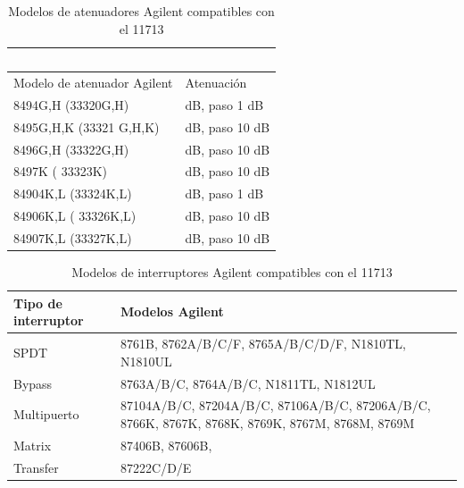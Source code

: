 \begin{table}
	\centering
	
	\tablefirsthead{}
	\tablehead{}
	\tabletail{}
	\tablelasttail{}
	\begin{supertabular}{|m{8.514cm}|m{8.514cm}|}
		\hline
			\\
		\hline
		Modelo de atenuador Agilent & \arraybslash Atenuación\\
		\hline
		8494G,H (33320G,H) &  dB, paso 1 dB \\
		\hline
		8495G,H,K (33321 G,H,K) &  dB, paso 10 dB \\
		\hline
		8496G,H (33322G,H) &  dB, paso 10 dB \\
		\hline
		8497K ( 33323K) &  dB, paso 10 dB \\
		\hline
		84904K,L (33324K,L) &  dB, paso 1 dB \\
		\hline
		84906K,L ( 33326K,L) &  dB, paso 10 dB \\
		\hline
		84907K,L (33327K,L) &  dB, paso 10 dB \\
		\hline
		
	\end{supertabular}
	
	\caption{Modelos de atenuadores Agilent compatibles con el 11713}		
	\label{Tab:AtenuadoresCompatibles11713}
	
\end{table}

\begin{table}
	\centering
	
	\tablefirsthead{}
	\tablehead{}
	\tabletail{}
	\tablelasttail{}
	\begin{supertabular}{|m{3.504cm}|m{13.527cm}|}
		\hline
		Tipo de interruptor & \arraybslash Modelos Agilent	\\
		\hline
		SPDT & \arraybslash 8761B, 8762A/B/C/F, 8765A/B/C/D/F, N1810TL, N1810UL	\\
		\hline
		Bypass & \arraybslash 8763A/B/C, 8764A/B/C, N1811TL, N1812UL\\
		\hline Multipuerto & \arraybslash 87104A/B/C, 87204A/B/C, 87106A/B/C, 87206A/B/C, 8766K, 8767K, 8768K, 8769K, 8767M, 8768M, 8769M	\\
		\hline
		Matrix & \arraybslash 87406B, 87606B, \\
		\hline Transfer & \arraybslash 87222C/D/E\\
		\hline	 			
	\end{supertabular}
	\caption{Modelos de interruptores Agilent compatibles con el 11713}
	\label{Tab:InterruptoresCompatibles11713}	
\end{table}		

